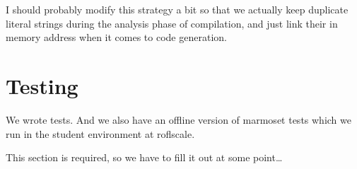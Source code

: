 \documentclass[pdftex,11pt,a4paper]{article}
\begin{document}
I should probably modify this strategy a bit so that we actually keep
duplicate literal strings during the analysis phase of compilation,
and just link their in memory address when it comes to code
generation.


\section{Testing}

We wrote tests. And we also have an offline version of marmoset tests
which we run in the student environment at roflscale.

This section is required, so we have to fill it out at some point\ldots
\end{document}
